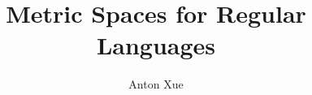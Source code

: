 \documentclass[12pt]{article}
\title{Metric Spaces for Regular Languages}
\author{Anton Xue}
\date{}
\begin{document}
\maketitle

\tableofcontents
\pagebreak


















\printbibliography
\end{document}
